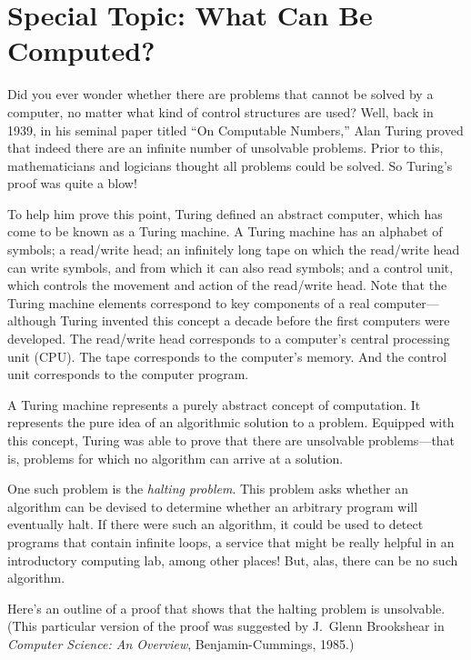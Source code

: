 \section*{{\color{cyan}Special Topic:} What Can Be Computed?}
{Did you} ever wonder whether there are problems that cannot be solved
by a computer, no matter what kind of control structures are used?
Well, back in 1939, in his seminal paper titled ``On Computable
Numbers,'' Alan Turing proved that indeed there are an infinite number
of unsolvable problems. Prior to this, mathematicians and logicians
thought all problems could be solved. So Turing's proof was quite
a blow!

To help him prove this point, Turing defined an abstract computer,
which has come to be known as a Turing machine. A Turing machine has
an alphabet of symbols; a read/write head; an infinitely long tape on
which the read/write head can write symbols, and from which it can also
read symbols; and a control unit, which controls the movement and
action of the read/write head. Note that the Turing machine
elements correspond to key components of a real computer---although
Turing invented this concept a decade before the first computers were
developed.  The read/write head corresponds to a computer's central
processing unit (CPU).  The tape corresponds to the computer's
memory. And the control unit corresponds to the computer program.

A Turing machine represents a purely abstract concept of computation.
It represents the pure idea of an algorithmic solution to a problem.
Equipped with this concept, Turing was able to prove that there are
unsolvable problems---that is, problems for which no algorithm can
arrive at a solution.

One such problem is the {\it halting problem}. This problem asks
whether an algorithm can be devised to determine whether an arbitrary
program will eventually halt. If there were such an algorithm, it
could be used to detect programs that contain infinite loops, a
service that might be really helpful in an introductory computing lab,
among other places!  But, alas, there can be no such algorithm.

Here's an outline of a proof that shows that the halting
problem is unsolvable. (This particular version of the proof was
suggested by J.~Glenn Brookshear in {\it Computer Science: An
Overview}, Benjamin-Cummings, 1985.)

